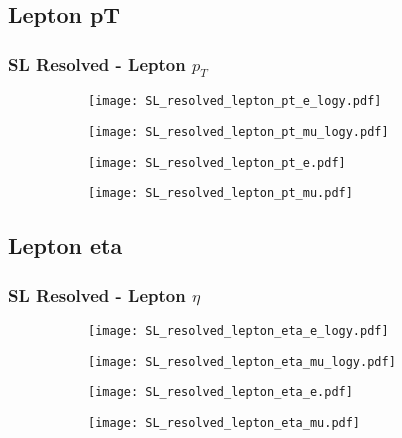 \documentclass[aspectratio=169,8pt]{beamer}
\begin{document}
\subsection{Lepton pT}
\begin{frame}
\frametitle{SL Resolved - Lepton $p_{T}$}
\begin{figure}
\captionsetup[subfigure]{labelformat=empty}
\begin{subfigure}{0.375\textwidth}
\texttt{[image: SL\_resolved\_lepton\_pt\_e\_logy.pdf]}
\vspace*{-0.15cm}
\end{subfigure}
\hfil
\begin{subfigure}{0.375\textwidth}
\texttt{[image: SL\_resolved\_lepton\_pt\_mu\_logy.pdf]}
\vspace*{-0.15cm}
\end{subfigure}
\hfil
\begin{subfigure}{0.375\textwidth}
\texttt{[image: SL\_resolved\_lepton\_pt\_e.pdf]}
\vspace*{-0.15cm}
\end{subfigure}
\hfil
\begin{subfigure}{0.375\textwidth}
\texttt{[image: SL\_resolved\_lepton\_pt\_mu.pdf]}
\vspace*{-0.15cm}
\end{subfigure}
\hfil
\end{figure}
\end{frame}
\newpage

\subsection{Lepton eta}
\begin{frame}
\frametitle{SL Resolved - Lepton $\eta$}
\begin{figure}
\captionsetup[subfigure]{labelformat=empty}
\begin{subfigure}{0.375\textwidth}
\texttt{[image: SL\_resolved\_lepton\_eta\_e\_logy.pdf]}
\vspace*{-0.15cm}
\end{subfigure}
\hfil
\begin{subfigure}{0.375\textwidth}
\texttt{[image: SL\_resolved\_lepton\_eta\_mu\_logy.pdf]}
\vspace*{-0.15cm}
\end{subfigure}
\hfil
\begin{subfigure}{0.375\textwidth}
\texttt{[image: SL\_resolved\_lepton\_eta\_e.pdf]}
\vspace*{-0.15cm}
\end{subfigure}
\hfil
\begin{subfigure}{0.375\textwidth}
\texttt{[image: SL\_resolved\_lepton\_eta\_mu.pdf]}
\vspace*{-0.15cm}
\end{subfigure}
\hfil
\end{figure}
\end{frame}
\newpage
\end{document}
